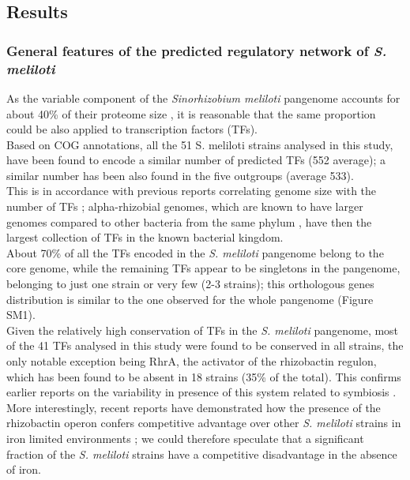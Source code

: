 \subsection{Results}

\subsubsection{General features of the predicted regulatory network of \textit{S. meliloti}}
As the variable component of the \textit{Sinorhizobium meliloti} pangenome accounts for about 40\% of their proteome size \cite{galardini2013replicon, sugawara2013comparative}, it is reasonable that the same proportion could be also applied to transcription factors (TFs).\\
Based on COG annotations, all the 51 S. meliloti  strains analysed in this study, have been found to encode a similar number of predicted TFs (552 average); a similar number has been also found in the five outgroups (average 533).\\
This is in accordance with previous reports correlating genome size with the number of TFs \cite{charoensawan2010genomic}; alpha-rhizobial genomes, which are known to have larger genomes compared to other bacteria from the same phylum \cite{pini2011plant}, have then the largest collection of TFs in the known bacterial kingdom.\\
About 70\% of all the TFs encoded in the \textit{S. meliloti} pangenome belong to the core genome, while the remaining TFs appear to be singletons in the pangenome, belonging to just one strain or very few (2-3 strains); this orthologous genes distribution is similar to the one observed for the whole pangenome \cite{lobkovsky2013gene} (Figure SM1).\\
 Given the relatively high conservation of TFs in the \textit{S. meliloti} pangenome, most of the 41 TFs analysed in this study were found to be conserved in all strains, the only notable exception being RhrA, the activator of the rhizobactin regulon, which has been found to be absent in 18 strains (35\% of the total). This confirms earlier reports on the variability in presence of this system related to symbiosis \cite{lynch2001genetic, gill1991high, galardini2011exploring}. More interestingly, recent reports have demonstrated how the presence of the rhizobactin operon confers competitive advantage over other \textit{S. meliloti} strains in iron limited environments \cite{maclean2014examination}; we could therefore speculate that a significant fraction of the \textit{S. meliloti} strains have a competitive disadvantage in the absence of iron.\\
